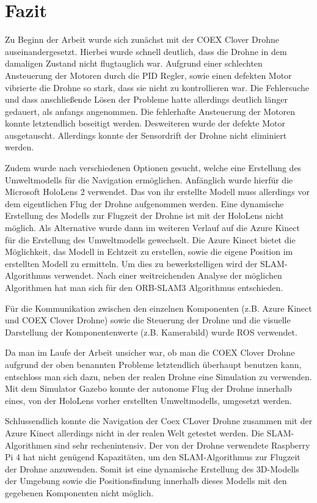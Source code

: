 \chapter{Fazit}
Zu Beginn der Arbeit wurde sich zunächst mit der COEX Clover Drohne auseinandergesetzt. Hierbei wurde schnell deutlich, dass die Drohne in dem damaligen Zustand nicht flugtauglich war. Aufgrund einer schlechten Ansteuerung der Motoren durch die \ac{PID} Regler, sowie einen defekten Motor vibrierte die Drohne so stark, dass sie nicht zu kontrollieren war. Die Fehlersuche und dass anschließende Lösen der Probleme hatte allerdings deutlich länger gedauert, als anfangs angenommen. Die fehlerhafte Ansteuerung der Motoren konnte letztendlich beseitigt werden. Desweiteren wurde der defekte Motor ausgetauscht. Allerdings konnte der Sensordrift der Drohne nicht eliminiert werden.

Zudem wurde nach verschiedenen Optionen gesucht, welche eine Erstellung des Umweltmodells für die Navigation ermöglichen. Anfänglich wurde hierfür die Microsoft HoloLens 2 verwendet. Das von ihr erstellte Modell muss allerdings vor dem eigentlichen Flug der Drohne aufgenommen werden. Eine dynamische Erstellung des Modells zur Flugzeit der Drohne ist mit der HoloLens nicht möglich. Als Alternative wurde dann im weiteren Verlauf auf die Azure Kinect für die Erstellung des Umweltmodells gewechselt. Die Azure Kinect bietet die Möglichkeit, das Modell in Echtzeit zu erstellen, sowie die eigene Position im erstellten Modell zu ermitteln. Um dies zu bewerkstelligen wird der SLAM-Algorithmus verwendet. Nach einer weitreichenden Analyse der möglichen Algorithmen hat man sich für den ORB-SLAM3 Algorithmus entschieden.

Für die Kommunikation zwischen den einzelnen Komponenten (z.B. Azure Kinect und COEX Clover Drohne) sowie die Steuerung der Drohne und die visuelle Darstellung der Komponentenwerte (z.B. Kamerabild) wurde \ac{ROS} verwendet.

Da man im Laufe der Arbeit unsicher war, ob man die COEX Clover Drohne aufgrund der oben benannten Probleme letztendlich überhaupt benutzen kann, entschloss man sich dazu, neben der realen Drohne eine Simulation zu verwenden. Mit dem Simulator Gazebo konnte der autonome Flug der Drohne innerhalb eines, von der HoloLens vorher erstellten Umweltmodells, umgesetzt werden. 

Schlussendlich konnte die Navigation der Coex CLover Drohne zusammen mit der Azure Kinect allerdings nicht in der realen Welt getestet werden. Die SLAM-Algorithmen sind sehr rechenintensiv. Der von der Drohne verwendete Raspberry Pi 4 hat nicht genügend Kapazitäten, um den SLAM-Algorithmus zur Flugzeit der Drohne anzuwenden. Somit ist eine dynamische Erstellung des 3D-Modells der Umgebung sowie die Positionsfindung innerhalb dieses Modells mit den gegebenen Komponenten nicht möglich.



